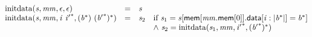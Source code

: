 $$
\begin{array}{@{}lcl@{}l@{}}
{\mathrm{initdata}}({\mathit{s}}, {\mathit{mm}}, \epsilon, \epsilon) &=& {\mathit{s}} &  \\
{\mathrm{initdata}}({\mathit{s}}, {\mathit{mm}}, {\mathit{i}}~{{\mathit{i}'}^\ast}, ({{\mathit{b}}^\ast})~{({{\mathit{b}'}^\ast})^\ast}) &=& {\mathit{s}}_{{2}} &\quad
  \mbox{if}~{\mathit{s}}_{{1}} = {\mathit{s}}{}[\mathsf{mem}{}[{\mathit{mm}}.\mathsf{mem}{}[0]].\mathsf{data}{}[{\mathit{i}} : {|{{\mathit{b}}^\ast}|}] = {{\mathit{b}}^\ast}] \\
 &&&\quad {\land}~{\mathit{s}}_{{2}} = {\mathrm{initdata}}({\mathit{s}}_{{1}}, {\mathit{mm}}, {{\mathit{i}'}^\ast}, {({{\mathit{b}'}^\ast})^\ast}) \\
\end{array}
$$

